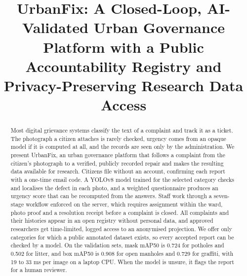\documentclass[conference]{IEEEtran}
\begin{document}
\title{UrbanFix: A Closed-Loop, AI-Validated Urban Governance Platform with a Public Accountability Registry and Privacy-Preserving Research Data Access}

\author{
\and
{}
}

\maketitle

\begin{abstract}
Most digital grievance systems classify the text of a complaint and track it as a ticket. The photograph a citizen attaches is rarely checked, urgency comes from an opaque model if it is computed at all, and the records are seen only by the administration. We present UrbanFix, an urban governance platform that follows a complaint from the citizen's photograph to a verified, publicly recorded repair and makes the resulting data available for research. Citizens file without an account, confirming each report with a one-time email code. A YOLOv8 model trained for the selected category checks and localises the defect in each photo, and a weighted questionnaire produces an urgency score that can be recomputed from the answers. Staff work through a seven-stage workflow enforced on the server, which requires assignment within the ward, photo proof and a resolution receipt before a complaint is closed. All complaints and their histories appear in an open registry without personal data, and approved researchers get time-limited, logged access to an anonymised projection. We offer only categories for which a public annotated dataset exists, so every accepted report can be checked by a model. On the validation sets, mask mAP50 is 0.724 for potholes and 0.502 for litter, and box mAP50 is 0.908 for open manholes and 0.729 for graffiti, with 19 to 33 ms per image on a laptop CPU. When the model is unsure, it flags the report for a human reviewer.
\end{abstract}
\end{document}
